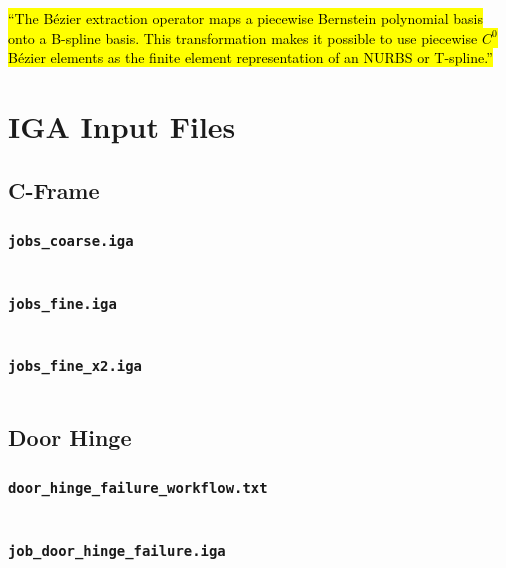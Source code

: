 \documentclass[12pt,report,justified]{SANDreport}
\begin{document}
\hl{``The B{\'e}zier extraction operator maps a piecewise Bernstein polynomial basis onto a B-spline basis.  This transformation makes it possible to use piecewise $C^0$ B{\'e}zier elements as the finite element representation of an NURBS or T-spline.''}


\chapter{IGA Input Files}

\section{C-Frame}

\subsection{\tt{jobs\_coarse.iga}}
\inputminted[stripnl=false]{json}{cframe_modal/jobs_coarse.json}

\subsection{\tt{jobs\_fine.iga}}
\inputminted[stripnl=false]{json}{cframe_modal/jobs_fine.json}

\subsection{\tt{jobs\_fine\_x2.iga}}
\inputminted[stripnl=false]{json}{cframe_modal/jobs_fine_x2.json}

\section{Door Hinge}

\subsection{\tt{door\_hinge\_failure\_workflow.txt}}
\inputminted[stripnl=false]{text}{door_hinge/door_hinge_failure_workflow.txt}

\subsection{\tt{job\_door\_hinge\_failure.iga}}
\inputminted[stripnl=false]{json}{door_hinge/job_door_hinge_failure.json}
\end{document}
